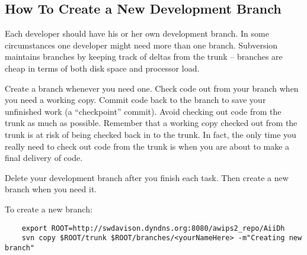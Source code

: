 
\subsection{How To Create a New Development Branch}

Each developer should have his or her own development branch.
In some circumstances one developer might need more than one
branch.  Subversion maintains branches by keeping track of 
deltas from the trunk -- branches are cheap in terms of 
both disk space and processor load.

Create a branch whenever you need one.  Check code out from 
your branch when you need a working copy.  Commit code back
to the branch to save your unfinished work (a ``checkpoint''
commit).  Avoid checking out code from the trunk as much as
possible.  Remember that a working copy checked out from the
trunk is at risk of being checked back in to the trunk.
In fact, the only time you really need to check out code
from the trunk is when you are about to make a final delivery
of code.

Delete your development branch after you finish each task.  Then
create a new branch when you need it.

To create a new branch:
\begin{verbatim}
    export ROOT=http://swdavison.dyndns.org:8080/awips2_repo/AiiDh
    svn copy $ROOT/trunk $ROOT/branches/<yourNameHere> -m"Creating new branch"
\end{verbatim}



